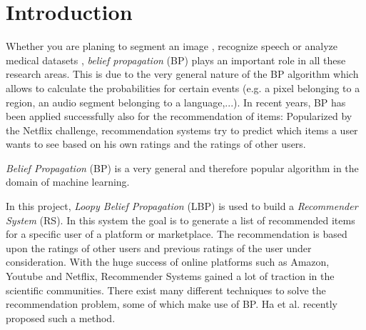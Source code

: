
\section{Introduction}\label{sec:intro}

Whether you are planing to segment an image \cite{1544822}, recognize speech \cite{5373446} or analyze medical datasets \cite{bailly2011finding}, \textit{belief propagation} (BP) plays an important role in all these research areas. This is due to the very general nature of the BP algorithm which allows to calculate the probabilities for certain events (e.g. a pixel belonging to a region, an audio segment belonging to a language,...). In recent years, BP has been applied successfully also for the recommendation of items: Popularized by the Netflix challenge, recommendation systems try to predict which items a user wants to see based on his own ratings and the ratings of other users.





\textit{Belief Propagation} (BP) is a very general and therefore popular algorithm in the domain of machine learning. %

In this project, \textit{Loopy Belief Propagation} (LBP) is used to build a \textit{Recommender System} (RS). In this system the goal is to generate a list of recommended items for a specific user of a platform or marketplace. The recommendation is based upon the ratings of other users and previous ratings of the user under consideration. With the huge success of online platforms such as Amazon, Youtube and Netflix, Recommender Systems gained a lot of traction in the scientific communities. There exist many different techniques to solve the recommendation problem, some of which make use of BP. Ha et al. \cite{Ha:2012:TRT:2396761.2398636} recently proposed such a method. 

